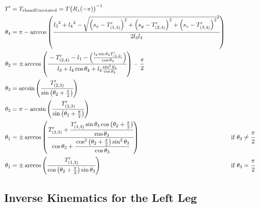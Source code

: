 \begin{align*}
T' &= T_\text{rhandUnrotated} = T{\big(R_z(-\pi)\big)}^{-1}\\
\theta_4 &= \pi - \arccos\left(\cfrac{{l_3}^2 + {l_4}^2 - \sqrt{\left(s_x-T'_{(1,4)}\right)^2 + \left(s_y-T'_{(2,4)}\right)^2 + \left(s_z-T'_{(3,4)}\right)^2}^2 }{2 l_3 l_4}\right)\\
\theta_2 &= \pm\arccos\left(\cfrac{ - T'_{(2,4)} - l_1 - \left(\frac{l_4\sin\theta_4T'_{(2,2)}}{\cos\theta_4} \right)}{l_3 +l_4\cos\theta_4 + l_4\frac{\sin^2\theta_4}{\cos\theta_4}}\right)-\frac{\pi}{2}\\
\theta_3 &= \arcsin\left(\cfrac{T'_{(2,3)}}{\sin\left(\theta_2 + \frac{\pi}{2}\right)}\right)\\
\theta_3 &= \pi - \arcsin\left(\cfrac{T'_{(2,3)}}{\sin\left(\theta_2 + \frac{\pi}{2}\right)}\right) \\
\theta_1 &= \pm\arccos\left(\cfrac{T'_{(3,3)} + \cfrac{T'_{(1,3)}\sin\theta_3\cos\left(\theta_2 + \frac{\pi}{2}\right)}{\cos\theta_3}}{\cos\theta_3 + \cfrac{\cos^2\left(\theta_2 + \frac{\pi}{2}\right)\sin^2\theta_3}{\cos\theta_3}}\right) &\text{if } \theta_3 \neq \cfrac{\pi}{2}& \\
\theta_1 &= \pm\arccos\left(\cfrac{T'_{(1,3)}}{\cos\left(\theta_2 +\frac{\pi}{2}\right)\sin\theta_3}\right) &\text{if } \theta_3 = \cfrac{\pi}{2}
\end{align*}





\subsection{Inverse Kinematics for the Left Leg}
\label{invleftleg}

